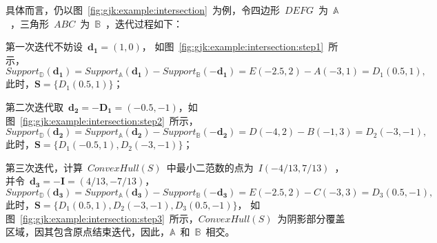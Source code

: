 具体而言，仍以图~\ref{fig:gjk:example:intersection}~为例，令四边形~$DEFG$~为~$\mathbb{A}$~，三角形~$ABC$~为~$\mathbb{B}$~，迭代过程如下：\\ \indent
\begin{inparaenum}[(1)]
\item 第一次迭代不妨设~$\bm{d_1} = (1,0)$，
如图~\ref{fig:gjk:example:intersection:step1}~所示，
$Support_\mathbb{D}(\bm{d_1})  = Support_\mathbb{A}(\bm{d_1}) - Support_\mathbb{B}(-\bm{d_1})  = E(-2.5, 2) - A(-3,1) = D_1(0.5, 1),$
此时，$\bm{S} = \{D_1(0.5, 1)\}$；\\ \indent
\item 第二次迭代取~$\bm{d_2}=-\bm{D_1}=(-0.5, -1)$，如图~\ref{fig:gjk:example:intersection:step2}~所示，
$Support_\mathbb{D}(\bm{d_2})   = Support_\mathbb{A}(\bm{d_2}) - Support_\mathbb{B}(-\bm{d_2})  = D(-4, 2) - B(-1, 3) = D_2(-3, -1),$
此时，$\bm{S} = \{D_1(-0.5, 1), D_2(-3, -1)\}$；\\ \indent
\item 第三次迭代，计算~$ConvexHull(S)$~中最小二范数的点为~$I(-4/13, 7/13)$~，
并令~$\bm{d_3}=-\bm{I}=(4/13, -7/13)$，
$ Support_\mathbb{D}(\bm{d_3})  = Support_\mathbb{A}(\bm{d_3}) - Support_\mathbb{B}(-\bm{d_3})  = E(-2.5, 2) - C(-3, 3) = D_3(0.5, -1),$
此时，$\bm{S} = \{D_1(0.5, 1), D_2(-3, -1), D_3(0.5, -1)\}$，
如图~\ref{fig:gjk:example:intersection:step3}~所示，$ConvexHull(S)$~为阴影部分覆盖区域，因其包含原点结束迭代，因此，$\mathbb{A}$~和~$\mathbb{B}$~相交。
\end{inparaenum}
